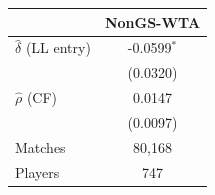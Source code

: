 \begin{tabular}{lc}
\toprule
 & NonGS-WTA \\
\midrule
$\hat{\delta}$ (LL entry) & -0.0599$^{*}$ \\
 & (0.0320) \\
$\hat{\rho}$ (CF) & 0.0147 \\
 & (0.0097) \\
\midrule
Matches & 80,168 \\
Players & 747 \\
\bottomrule
\end{tabular}
